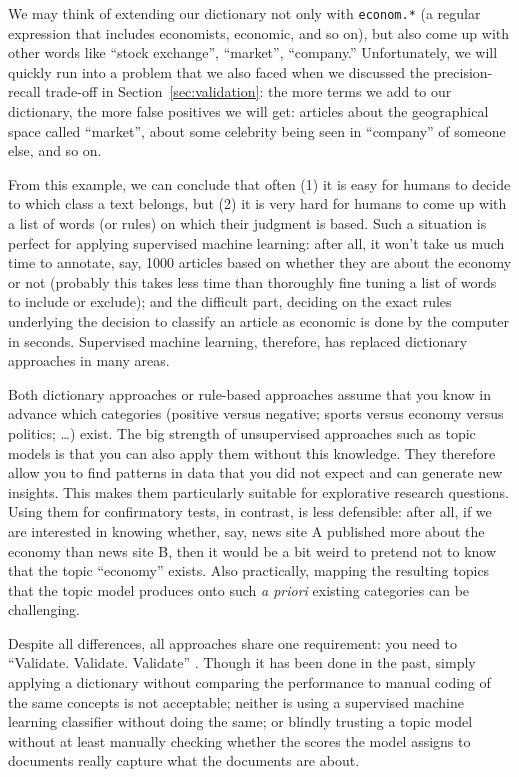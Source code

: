 We may think of extending our dictionary not only with \verb|econom.*| (a
regular expression that includes economists, economic, and so on), but
also come up with other words like ``stock exchange'', ``market'',
``company.'' Unfortunately, we will quickly run into a problem that we also
faced when we discussed the precision-recall trade-off in
Section~\ref{sec:validation}: the more terms we add to our
dictionary, the more false positives we will get: articles about
the geographical space called ``market'', about some celebrity being seen
in ``company'' of someone else, and so on.

From this example, we can conclude that often (1) it is easy for
humans to decide to which class a text belongs, but (2) it is very
hard for humans to come up with a list of words (or rules) on which
their judgment is based.  Such a situation is perfect for applying
supervised machine learning: after all, it won't take us much time to
annotate, say, 1000 articles based on whether they are about the
economy or not (probably this takes less time than thoroughly
fine tuning a list of words to include or exclude); and the difficult part,
deciding on the exact rules underlying the decision to classify an
article as economic is done by the computer in seconds. Supervised
machine learning, therefore, has replaced dictionary approaches in
many areas.

Both dictionary approaches or rule-based approaches assume that you
know in advance which categories (positive versus negative; sports
versus economy versus politics; \ldots) exist. The big strength of unsupervised
approaches such as topic models is that you can also apply them 
without this knowledge. They therefore allow you to find patterns
in data that you did not expect and can generate new insights. This
makes them particularly suitable for explorative research questions.
Using them for confirmatory tests, in contrast, is less defensible:
after all, if we are interested in knowing whether, say, news site A
published more about the economy than news site B, then it would be
a bit weird to pretend not to know that the topic ``economy'' exists.
Also practically, mapping the resulting topics that the topic model
produces onto such \emph{a priori} existing categories can be challenging.

Despite all differences, all approaches share one requirement: you
need to ``Validate. Validate. Validate'' \citep{Grimmer2013}. Though
it has been done in the past, simply applying a dictionary without
comparing the performance to manual coding of the same concepts
is not acceptable; neither is using a supervised machine learning
classifier without doing the same; or blindly trusting a topic model
without at least manually checking whether the scores the model assigns
to documents really capture what the documents are about.


